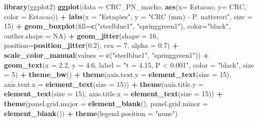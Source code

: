 \documentclass[
]{book}
\newenvironment{Shaded}{\begin{snugshade}}{\end{snugshade}}
\newcommand{\DataTypeTok}[1]{\textcolor[rgb]{0.13,0.29,0.53}{#1}}
\newcommand{\DecValTok}[1]{\textcolor[rgb]{0.00,0.00,0.81}{#1}}
\newcommand{\FloatTok}[1]{\textcolor[rgb]{0.00,0.00,0.81}{#1}}
\newcommand{\KeywordTok}[1]{\textcolor[rgb]{0.13,0.29,0.53}{\textbf{#1}}}
\newcommand{\NormalTok}[1]{#1}
\newcommand{\OperatorTok}[1]{\textcolor[rgb]{0.81,0.36,0.00}{\textbf{#1}}}
\newcommand{\OtherTok}[1]{\textcolor[rgb]{0.56,0.35,0.01}{#1}}
\newcommand{\StringTok}[1]{\textcolor[rgb]{0.31,0.60,0.02}{#1}}
\begin{document}
\begin{Shaded}
\begin{Highlighting}[]
\KeywordTok{library}\NormalTok{(ggplot2)}
\KeywordTok{ggplot}\NormalTok{(}\DataTypeTok{data =}\NormalTok{ CRC_PN_macho, }\KeywordTok{aes}\NormalTok{(}\DataTypeTok{x=}\NormalTok{ Estacao, }\DataTypeTok{y=}\NormalTok{ CRC, }\DataTypeTok{color =}\NormalTok{ Estacao)) }\OperatorTok{+}\StringTok{ }
\StringTok{  }\KeywordTok{labs}\NormalTok{(}\DataTypeTok{x =} \StringTok{"Estações"}\NormalTok{, }\DataTypeTok{y =} \StringTok{"CRC (mm) - P. nattereri"}\NormalTok{, }\DataTypeTok{size =} \DecValTok{15}\NormalTok{) }\OperatorTok{+}
\StringTok{  }\KeywordTok{geom_boxplot}\NormalTok{(}\DataTypeTok{fill=}\KeywordTok{c}\NormalTok{(}\StringTok{"steelblue1"}\NormalTok{, }\StringTok{"springgreen1"}\NormalTok{), }\DataTypeTok{color=}\StringTok{"black"}\NormalTok{, }\DataTypeTok{outlier.shape =} \OtherTok{NA}\NormalTok{) }\OperatorTok{+}
\StringTok{  }\KeywordTok{geom_jitter}\NormalTok{(}\DataTypeTok{shape =} \DecValTok{16}\NormalTok{, }\DataTypeTok{position=}\KeywordTok{position_jitter}\NormalTok{(}\FloatTok{0.2}\NormalTok{), }\DataTypeTok{cex =} \DecValTok{7}\NormalTok{, }\DataTypeTok{alpha =} \FloatTok{0.7}\NormalTok{) }\OperatorTok{+}
\StringTok{  }\KeywordTok{scale_color_manual}\NormalTok{(}\DataTypeTok{values =} \KeywordTok{c}\NormalTok{(}\StringTok{"steelblue1"}\NormalTok{, }\StringTok{"springgreen1"}\NormalTok{)) }\OperatorTok{+}
\StringTok{  }\KeywordTok{geom_text}\NormalTok{(}\DataTypeTok{x =} \FloatTok{2.2}\NormalTok{, }\DataTypeTok{y =} \FloatTok{4.6}\NormalTok{, }\DataTypeTok{label =} \StringTok{"t = 4.15, P < 0.001"}\NormalTok{, }\DataTypeTok{color =} \StringTok{"black"}\NormalTok{, }\DataTypeTok{size =} \DecValTok{5}\NormalTok{) }\OperatorTok{+}
\StringTok{  }\KeywordTok{theme_bw}\NormalTok{() }\OperatorTok{+}
\StringTok{  }\KeywordTok{theme}\NormalTok{(}\DataTypeTok{axis.text.y =} \KeywordTok{element_text}\NormalTok{(}\DataTypeTok{size =} \DecValTok{15}\NormalTok{), }\DataTypeTok{axis.text.x =} \KeywordTok{element_text}\NormalTok{(}\DataTypeTok{size =} \DecValTok{15}\NormalTok{)) }\OperatorTok{+}
\StringTok{  }\KeywordTok{theme}\NormalTok{(}\DataTypeTok{axis.title.y =} \KeywordTok{element_text}\NormalTok{(}\DataTypeTok{size =} \DecValTok{15}\NormalTok{), }\DataTypeTok{axis.title.x =} \KeywordTok{element_text}\NormalTok{(}\DataTypeTok{size =} \DecValTok{15}\NormalTok{)) }\OperatorTok{+}
\StringTok{  }\KeywordTok{theme}\NormalTok{(}\DataTypeTok{panel.grid.major =} \KeywordTok{element_blank}\NormalTok{(), }\DataTypeTok{panel.grid.minor =} \KeywordTok{element_blank}\NormalTok{()) }\OperatorTok{+}
\StringTok{  }\KeywordTok{theme}\NormalTok{(}\DataTypeTok{legend.position =} \StringTok{"none"}\NormalTok{)}
\end{Highlighting}
\end{Shaded}
\end{document}
